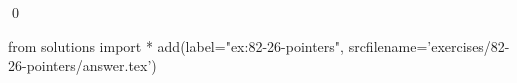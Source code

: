 
\begin{ex}
  \label{ex:82-26-pointers}
  
  \qed
\end{ex}
\begin{python0}
from solutions import *
add(label="ex:82-26-pointers",
    srcfilename='exercises/82-26-pointers/answer.tex')
\end{python0}
